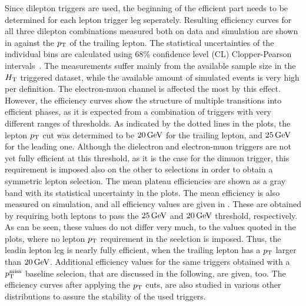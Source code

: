 Since dilepton triggers are used, the beginning of the efficient part needs to be determined for each lepton trigger leg seperately. Resulting efficiency curves for all three dilepton combinations measured both on data and simulation are shown in  against the $p_{\mathrm{T}}$ of the trailing lepton. The statistical uncertainties of the individual bins are calculated using $68\%$ confidence level (CL) Clopper-Pearson intervals~\cite{ClopperPearson}. The measurements suffer mainly from the available sample size in the $H_{\mathrm{T}}$ triggered dataset, while the available amount of simulated events is very high per definition. The electron-muon channel is affected the most by this effect. However, the efficiency curves show the structure of multiple transitions into efficient phases, as it is expected from a combination of triggers with very different ranges of thresholds. As indicated by the dotted lines in the plots, the lepton $p_{\mathrm{T}}$ cut was determined to be $20\,\text{Ge\hspace{-.08em}V}$ for the trailing lepton, and $25\,\text{Ge\hspace{-.08em}V}$ for the leading one. Although the dielectron and electron-muon triggers are not yet fully efficient at this threshold, as it is the case for the dimuon trigger, this requirement is imposed also on the other to selections in order to obtain a symmetric lepton selection. The mean plateau efficiencies are shown as a gray band with its statistical uncertainty in the plots. The mean efficiency is also measured on simulation, and all efficiency values are given in . These are obtained by requiring both leptons to pass the $25\,\text{Ge\hspace{-.08em}V}$ and $20\,\text{Ge\hspace{-.08em}V}$ threshold, respectively. As can be seen, these values do not differ very much, to the values quoted in the plots, where no lepton $p_{\mathrm{T}}$ requirement in the seelction is imposed. Thus, the leadin lepton leg is nearly fully efficient, when the trailing lepton has a $p_{\mathrm{T}}$ larger than $20\,\text{Ge\hspace{-.08em}V}$. Additional efficiency values for the same triggers obtained with a $p_{\mathrm{T}}^\text{miss}$ baseline selecion, that are discussed in the following, are given, too.
The efficiency curves after applying the $p_{\mathrm{T}}$ cuts, are also studied in various other distributions to assure the stability of the used triggers.

